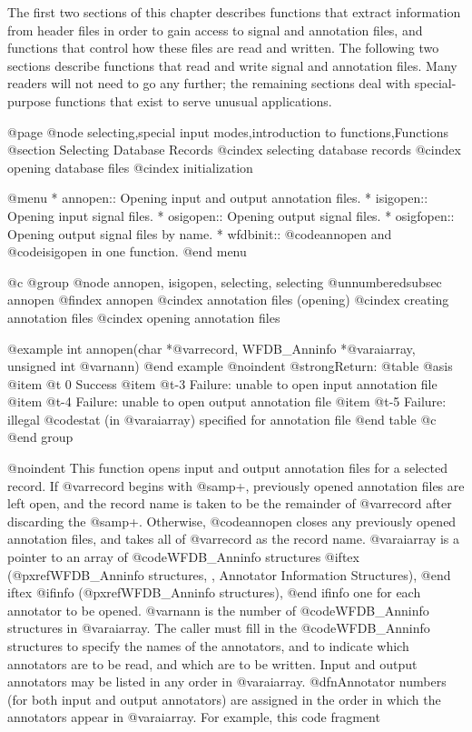 {{{{{{{{{The first two sections of this chapter describes functions that extract
information from header files in order to gain access to signal
and annotation files, and functions that control how these files
are read and written.  The following two sections describe functions
that read and write signal and annotation files.  Many readers will not need
to go any further; the remaining sections deal with special-purpose
functions that exist to serve unusual applications.

@page
@node selecting,special input modes,introduction to functions,Functions
@section Selecting Database Records
@cindex selecting database records
@cindex opening database files
@cindex initialization

@menu
* annopen::		Opening input and output annotation files.
* isigopen::		Opening input signal files.
* osigopen::		Opening output signal files.
* osigfopen::		Opening output signal files by name.
* wfdbinit::		@code{annopen} and @code{isigopen} in one function.
@end menu

@c @group
@node     annopen, isigopen, selecting, selecting
@unnumberedsubsec annopen
@findex annopen
@cindex annotation files (opening)
@cindex creating annotation files
@cindex opening annotation files

@example
int annopen(char *@var{record}, WFDB_Anninfo *@var{aiarray}, unsigned int @var{nann})
@end example
@noindent
@strong{Return:}
@table @asis
@item @t{ 0}
Success
@item @t{-3}
Failure: unable to open input annotation file
@item @t{-4}
Failure: unable to open output annotation file
@item @t{-5}
Failure: illegal @code{stat} (in @var{aiarray}) specified for annotation file
@end table
@c @end group

@noindent
This function opens input and output annotation files for a selected
record.  If @var{record} begins with @samp{+}, previously opened
annotation files are left open, and the record name is taken to be the
remainder of @var{record} after discarding the @samp{+}.  Otherwise,
@code{annopen} closes any previously opened annotation files, and takes
all of @var{record} as the record name.  @var{aiarray} is a pointer to
an array of @code{WFDB_Anninfo} structures
@iftex
(@pxref{WFDB_Anninfo structures, , Annotator Information Structures}),
@end iftex
@ifinfo
(@pxref{WFDB_Anninfo structures}),
@end ifinfo
one for each annotator to be opened.  @var{nann} is the number of
@code{WFDB_Anninfo} structures in @var{aiarray}.  The caller must
fill in the @code{WFDB_Anninfo} structures to specify the names of the
annotators, and to indicate which annotators are to be read, and which
are to be written.  Input and output annotators may be listed in any
order in @var{aiarray}.  @dfn{Annotator numbers} (for both input and
output annotators) are assigned in the order in which the annotators
appear in @var{aiarray}.  For example, this code fragment

}}}}}}}}}
